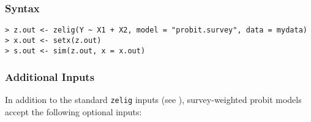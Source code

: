 \subsubsection{Syntax}

\begin{verbatim}
> z.out <- zelig(Y ~ X1 + X2, model = "probit.survey", data = mydata)
> x.out <- setx(z.out)
> s.out <- sim(z.out, x = x.out)
\end{verbatim}


\subsubsection{Additional Inputs}

In addition to the standard {\tt zelig} inputs (see
), survey-weighted probit models accept the following
optional inputs:
